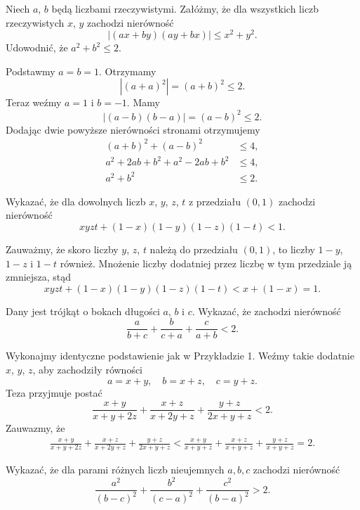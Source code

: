 \newpage
{}
\begin{problem}{1}
	Niech $a$, $b$ będą liczbami rzeczywistymi. Załóżmy, że dla wszystkich liczb rzeczywistych $x$, $y$ zachodzi nierówność
	\[
		|(ax + by)(ay + bx)| \leqslant x^2 + y^2.
	\]
	Udowodnić, że $a^2 + b^2 \leqslant 2$.
\end{problem}

\noindent
Podstawmy $a = b = 1$. Otrzymamy
\[
	|(a + a)^2| = (a + b)^2 \leqslant 2.
\]
Teraz weźmy $a = 1$ i $b = -1$. Mamy
\[
	|(a - b)(b - a)| = (a - b)^2 \leqslant 2.
\]
Dodając dwie powyższe nierówności stronami otrzymujemy
\begin{align*}
	(a + b)^2 + (a - b)^2 &\leqslant 4, \\
	a^2 + 2ab + b^2 + a^2 - 2ab + b^2 &\leqslant 4, \\
	a^2 + b^2 &\leqslant 2.
\end{align*}

\begin{problem}{2}
Wykazać, że dla dowolnych liczb $x$, $y$, $z$, $t$ z przedziału $(0, 1)$ zachodzi nierówność
\[
	xyzt + (1 - x)(1 - y)(1 - z)(1 - t) < 1.
\]
\end{problem}

\noindent
Zauważmy, że skoro liczby $y$, $z$, $t$ należą do przedziału $(0, 1)$, to liczby $1 - y$, $1 - z$ i $1 - t$ również. Mnożenie liczby dodatniej przez liczbę w tym przedziale ją zmniejsza, stąd
\[
	xyzt + (1 - x)(1 - y)(1 - z)(1 - t) < x + (1 - x) = 1.
\]

\begin{problem}{3}
Dany jest trójkąt o bokach długości $a$, $b$ i $c$. Wykazać, że zachodzi nierówność
\[
	\frac{a}{b + c} + \frac{b}{c + a} + \frac{c}{a + b} < 2.
\]
\end{problem}

\noindent
Wykonajmy identyczne podstawienie jak w Przykładzie 1. Weźmy takie dodatnie $x$, $y$, $z$, aby zachodziły równości
\[
	a = x + y, \quad b = x + z, \quad c = y + z.
\]
Teza przyjmuje postać
\[
	\frac{x + y}{x + y + 2z} + \frac{x + z}{x + 2y + z} + \frac{y + z}{2x + y + z} < 2.
\]
Zauwazmy, że
\begin{align*}
	\frac{x + y}{x + y + 2z} + \frac{x + z}{x + 2y + z} + \frac{y + z}{2x + y + z} < \frac{x + y}{x + y + z} + \frac{x + z}{x + y + z} + \frac{y + z}{x + y + z} = 2.
\end{align*}

\begin{problem}{4}
Wykazać, że dla parami różnych liczb nieujemnych $a,b,c$ zachodzi nierówność
\[
	\frac{a^2}{(b - c)^2} + \frac{b^2}{(c - a)^2} + \frac{c^2}{(b - a)^2} > 2.
\]
\end{problem}

